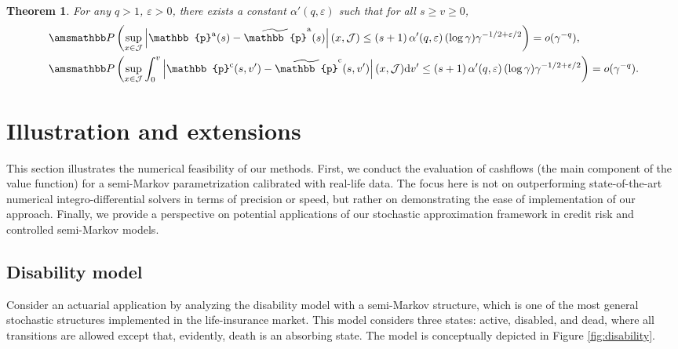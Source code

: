 \documentclass[11pt,leqno]{amsart}
\numberwithin{table}{section}
\numberwithin{figure}{section}
\numberwithin{equation}{section}
\newcommand{\dd}{\mathrm{d}}
\newcommand{\1}{{\mathds{1}}}
\newcommand{\0}{\mat{0}}
\renewcommand{\P }{{\amsmathbb P}}
\newtheorem{theorem}[lemma]{Theorem}
\newtheorem{example}[lemma]{Example}
\newcommand{\ap}[1]{\mathbb{#1}}
\newcommand{\tld}[1]{\widetilde{#1}}
\newcommand{\apt}[1]{\tld{\mathbb{#1}}}
\begin{document}
{{\begin{theorem}\label{th:convergence_densities_general}
For any $q>1$, $\varepsilon > 0$, there exists a constant $\alpha'(q,\varepsilon)$ such that for all $s\ge v\ge 0$,
\begin{align*}
&\P\left(\sup_{x\in\mathcal{J}}\left|\ap{p}^{\mathrm{a}}(s) - \apt{p}^{\mathrm{a}}(s)\right|(x,\mathcal{J})\le (s+1)\,\alpha'(q,\varepsilon)\,(\log \gamma)\gamma^{-1/2 + \varepsilon/2}\right)=o(\gamma^{-q}),\\
&\P\left(\sup_{x\in\mathcal{J}}\int_0^v \left|\ap{p}^{\mathrm{c}}(s,v') - \apt{p}^{\mathrm{c}}(s,v')\right| (x,\mathcal{J}) \dd v'\le (s+1)\,\alpha'(q,\varepsilon)\,(\log \gamma)\gamma^{-1/2 + \varepsilon/2}\right)=o(\gamma^{-q}).
\end{align*}
\end{theorem}
}

\section{Illustration and extensions}\label{sec:examples}
{ This section illustrates the numerical feasibility of our methods. First, we conduct the evaluation of cashflows (the main component of the value function) for a semi-Markov parametrization calibrated with real-life data. The focus here is not on outperforming state-of-the-art numerical integro-differential solvers in terms of precision or speed, but rather on demonstrating the ease of implementation of our approach. Finally, we provide a perspective on potential applications of our stochastic approximation framework in credit risk and controlled semi-Markov models.}

\subsection{Disability model}

Consider an actuarial application by analyzing the disability model with a semi-Markov structure, which is one of the most general stochastic structures implemented in the life-insurance market. This model considers three states: active, disabled, and dead, where all transitions are allowed except that, evidently, death is an absorbing state. The model is conceptually depicted in Figure \ref{fig:disability}.

}
\end{document}
